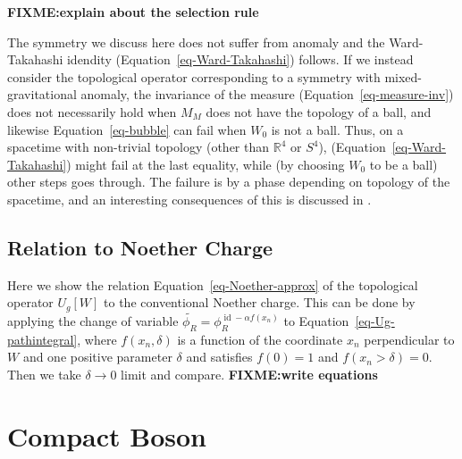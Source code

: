 \documentclass[
  letterpaper,
  DIV=11,
  numbers=noendperiod]{scrreport}
\DeclareMathOperator{\id}{id}
\begin{document}
\textbf{FIXME:explain about the selection rule}

\begin{tcolorbox}[enhanced jigsaw, colframe=quarto-callout-tip-color-frame, leftrule=.75mm, bottomrule=.15mm, breakable, toptitle=1mm, toprule=.15mm, coltitle=black, opacityback=0, opacitybacktitle=0.6, titlerule=0mm, colbacktitle=quarto-callout-tip-color!10!white, colback=white, bottomtitle=1mm, title=\textcolor{quarto-callout-tip-color}{\faLightbulb}\hspace{0.5em}{\textsf{Mixed-gravitational anomaly}}, rightrule=.15mm, arc=.35mm, left=2mm]

The symmetry we discuss here does not suffer from anomaly and the
Ward-Takahashi idendity (Equation~\ref{eq-Ward-Takahashi}) follows. If
we instead consider the topological operator corresponding to a symmetry
with mixed-gravitational anomaly, the invariance of the measure
(Equation~\ref{eq-measure-inv}) does not necessarily hold when \(M_M\)
does not have the topology of a ball, and likewise
Equation~\ref{eq-bubble} can fail when \(W_0\) is not a ball. Thus, on a
spacetime with non-trivial topology (other than \(\mathbb{R}^4\) or
\(S^4\)), (Equation~\ref{eq-Ward-Takahashi}) might fail at the last
equality, while (by choosing \(W_0\) to be a ball) other steps goes
through. The failure is by a phase depending on topology of the
spacetime, and an interesting consequences of this is discussed in
\autocite{Cordova:2019jqi}.

\end{tcolorbox}

\hypertarget{relation-to-noether-charge}{%
\section{Relation to Noether Charge}\label{relation-to-noether-charge}}

Here we show the relation Equation~\ref{eq-Noether-approx} of the
topological operator \(U_g[W]\) to the conventional Noether charge. This
can be done by applying the change of variable
\(\widetilde{\phi_R} = \phi^{\id - \alpha f(x_n)}_R\) to
Equation~\ref{eq-Ug-pathintegral}, where \(f(x_n,\delta)\) is a function
of the coordinate \(x_n\) perpendicular to \(W\) and one positive
parameter \(\delta\) and satisfies \(f(0) = 1\) and
\(f(x_n>\delta) =0\). Then we take \(\delta\to 0\) limit and compare.
\textbf{FIXME:write equations}


\hypertarget{sec-compact-boson}{%
\chapter{Compact Boson}\label{sec-compact-boson}}
\end{document}
